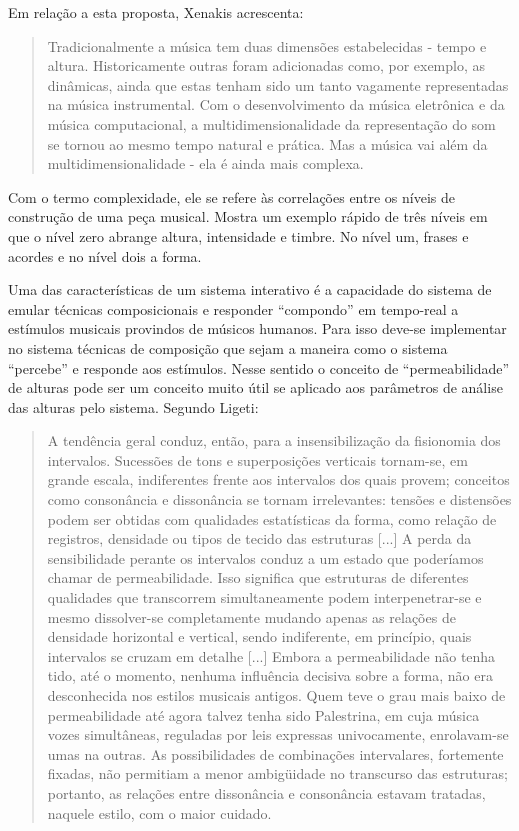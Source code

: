\documentclass{ppgmus}
\begin{document}
Em relação a esta proposta, Xenakis acrescenta: 

\begin{quote}
Tradicionalmente a música tem duas dimensões estabelecidas - tempo e
altura. Historicamente outras foram adicionadas como, por exemplo, as
dinâmicas, ainda que estas tenham sido um tanto vagamente
representadas na música instrumental. Com o desenvolvimento da música
eletrônica e da música computacional, a multidimensionalidade da
representação do som se tornou ao mesmo tempo natural e prática. Mas a
música vai além da multidimensionalidade - ela é ainda mais complexa. \cite{xenakis96:determinacy}
  
\end{quote} 

Com o termo complexidade, ele se refere às correlações entre os níveis
de construção de uma peça musical. Mostra um exemplo rápido de três
níveis em que o nível zero abrange altura, intensidade e timbre. No
nível um, frases e acordes e no nível dois a forma.

Uma das características de um sistema interativo é a capacidade do sistema
de emular técnicas composicionais e responder ``compondo'' em tempo-real a
estímulos musicais provindos de músicos humanos. Para isso deve-se implementar
no sistema técnicas de composição que sejam a maneira como o sistema ``percebe''
e responde aos estímulos. Nesse sentido o conceito de “permeabilidade” de 
alturas \cite{ligeti58:transformacoes} pode ser um conceito muito útil se aplicado aos parâmetros
de análise das alturas pelo sistema. Segundo Ligeti:

\begin{quote}
  A tendência geral conduz, então, para a insensibilização da
  fisionomia dos intervalos. Sucessões de tons e superposições
  verticais tornam-se, em grande escala, indiferentes frente aos
  intervalos dos quais provem; conceitos como consonância e
  dissonância se tornam irrelevantes: tensões e distensões podem ser
  obtidas com qualidades estatísticas da forma, como relação de
  registros, densidade ou tipos de tecido das estruturas [...] A perda
  da sensibilidade perante os intervalos conduz a um estado que
  poderíamos chamar de permeabilidade. Isso significa que estruturas
  de diferentes qualidades que transcorrem simultaneamente podem
  interpenetrar-se e mesmo dissolver-se completamente mudando apenas
  as relações de densidade horizontal e vertical, sendo indiferente,
  em princípio, quais intervalos se cruzam em detalhe [...] Embora a
  permeabilidade não tenha tido, até o momento, nenhuma influência
  decisiva sobre a forma, não era desconhecida nos estilos musicais
  antigos. Quem teve o grau mais baixo de permeabilidade até agora
  talvez tenha sido Palestrina, em cuja música vozes simultâneas,
  reguladas por leis expressas univocamente, enrolavam-se umas na
  outras. As possibilidades de combinações intervalares, fortemente
  fixadas, não permitiam a menor ambigüidade no transcurso das
  estruturas; portanto, as relações entre dissonância e consonância
  estavam tratadas, naquele estilo, com o maior cuidado.
\end{quote}
 
\end{document}
